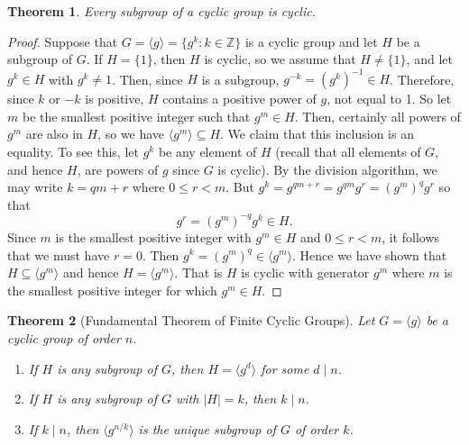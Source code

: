 \documentclass[11pt]{article}
\newcommand{\Z} {{\mathbb Z}}
\newcommand{\divides}{\ensuremath{\mid}}
\newcommand{\<}{\ensuremath{\langle}}
\renewcommand{\>}{\ensuremath{\rangle}}
\theoremstyle{plain}
\newtheorem{thm}{Theorem}%
\theoremstyle{definition}
\begin{document}
\begin{thm}
\label{thm:9}   Every subgroup of a cyclic group is cyclic.
\end{thm}

\begin{proof}
Suppose that $G=\langle g\rangle =\{g^k: k\in \Z\}$ is a cyclic
group and let $H$ be a subgroup of $G$.  If $H=\{1\}$, then $H$ is
cyclic, so we assume that $H\ne \{1\}$, and let $g^k\in H$ with
$g^k\ne 1$.  Then, since $H$ is a subgroup, $g^{-k} =
(g^k)^{-1}\in H$.  Therefore, since $k$ or $-k$ is positive,  $H$
contains a positive power of $g$, not equal to 1.  So let $m$ be
the smallest positive integer such that $g^m\in H$.  Then,
certainly all powers of $g^m$ are also in $H$, so we have $\langle
g^m\rangle \subseteq H$.  We claim that this inclusion is an
equality.  To see this, let $g^k$ be any element of $H$ (recall
that all elements of $G$, and hence $H$, are powers of $g$ since
$G$ is cyclic).  By the division algorithm, we may write $k=qm+r$
where $0\le r<m$.  But $g^k=g^{qm+r}=g^{qm}g^r=(g^m)^qg^r$ so that
$$g^r=(g^m)^{-q}g^k\in H.$$ Since $m$ is the smallest positive
integer with $g^m\in H$ and $0\le r<m$, it follows that we must
have $r=0$.  Then $g^k=(g^m)^q\in \langle g^m\rangle$. Hence we
have shown that $H\subseteq \langle g^m\rangle$ and hence
$H=\langle g^m\rangle$.  That is $H$ is cyclic with generator
$g^m$ where $m$ is the smallest positive integer for which $g^m
\in H$.
\end{proof}

\begin{thm}[Fundamental Theorem of Finite Cyclic Groups]
\label{thm:10}
Let $G=\langle g\rangle$ be a cyclic group of order $n$.
\begin{enumerate}
\item  If $H$ is any subgroup of $G$, then $H=\langle g^d\rangle$ for some $d\divides n$.
\item  If $H$ is any subgroup of $G$ with $|H|=k$, then $k\divides n$.
\item  If $k\divides n$, then $\langle g^{n/k}\rangle$ is the unique subgroup
of $G$ of order $k$.
\end{enumerate}
\end{thm}
\end{document}
